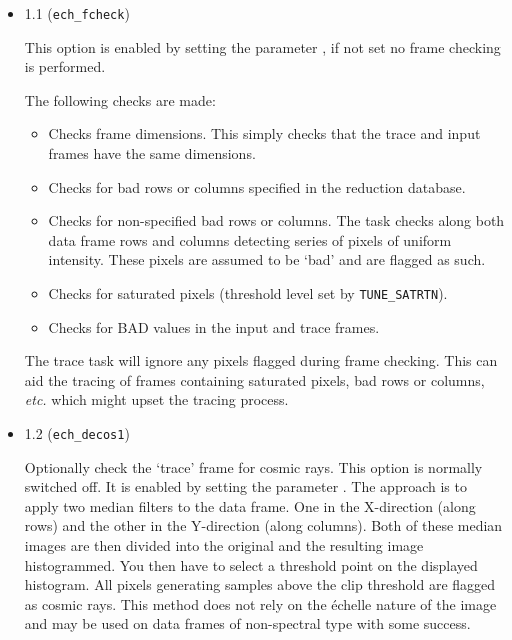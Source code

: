 \begin{itemize}


\item {} {1.1} (\verb+ech_fcheck+)

This option is enabled by setting the parameter
,
if not set no frame checking is performed.

The following checks are made:

\begin{itemize}

\item Checks frame dimensions.  This simply checks that the trace and input
      frames have the same dimensions.

\item Checks for bad rows or columns specified in the reduction database.

\item Checks for non-specified bad rows or columns.
      The task checks along both data frame rows and columns detecting
      series of pixels of uniform intensity.
      These pixels are assumed to be `bad' and are flagged as such.

\item Checks for saturated pixels (threshold level set by \verb+TUNE_SATRTN+).

\item Checks for BAD values in the input and trace frames.

\end{itemize}

The trace task will ignore any pixels flagged during frame checking.
This can aid the tracing of frames containing saturated pixels, bad rows or
columns, {\it{etc.}} which might upset the tracing process.


\item {} {1.2} (\verb+ech_decos1+)

Optionally check the `trace' frame for cosmic rays. This option is
normally switched off. It is enabled by setting the parameter
\@.
The approach is to apply two median filters to the data frame. One in
the X-direction (along rows) and the other in the Y-direction (along
columns). Both of these median images are then divided into the
original and the resulting image histogrammed. You then have to select a
threshold point on the displayed histogram. All
pixels generating samples above the clip threshold are flagged as
cosmic rays. This method does not rely on the \'{e}chelle nature of the
image and may be used on data frames of non-spectral type with some
success.



\end{itemize}
